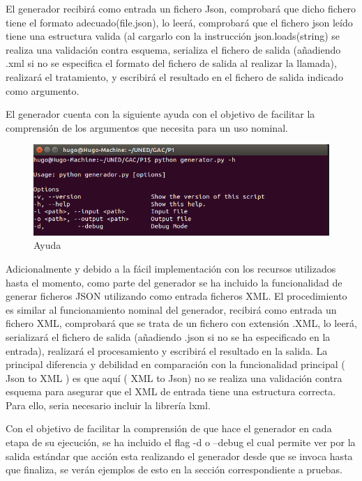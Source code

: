 \documentclass[a4paper,11pt]{book}
\begin{document}
El generador recibirá como entrada un fichero Json, comprobará que dicho fichero tiene el formato adecuado(file.json), lo leerá, comprobará que el fichero json leído tiene una estructura valida (al cargarlo con la instrucción json.loads(string) se realiza una validación contra esquema, serializa el fichero de salida (añadiendo .xml si no se especifica el formato del fichero de salida al realizar la llamada), realizará el tratamiento, y escribirá el resultado en el fichero de salida indicado como argumento. 

El generador cuenta con la siguiente ayuda con el objetivo de facilitar la comprensión de los argumentos que necesita para un uso nominal. 

\begin{figure}[htbpH]  
\centering 
\includegraphics[scale=0.35]{imagenes/help.png}
\caption{ Ayuda  }  
\end{figure}  

Adicionalmente y debido a la fácil implementación con los recursos utilizados hasta el momento, como parte del generador se ha incluido la funcionalidad de generar ficheros JSON utilizando como entrada ficheros XML. El procedimiento es similar al funcionamiento nominal del generador, recibirá como entrada un fichero XML, comprobará que se trata de un fichero con extensión .XML, lo leerá, serializará el fichero de salida (añadiendo .json si no se ha especificado en la entrada), realizará el procesamiento y escribirá el resultado en la salida. La principal diferencia y debilidad en comparación con la funcionalidad principal ( Json to XML ) es que aquí ( XML to Json) no se realiza una validación contra esquema para asegurar que el XML de entrada tiene una estructura correcta. Para ello, seria necesario incluir la librería lxml. 

Con el objetivo de facilitar la comprensión de que hace el generador en cada etapa de su ejecución, se ha incluido el flag -d o --debug el cual permite ver por la salida estándar que acción esta realizando el generador desde que se invoca hasta que finaliza, se verán ejemplos de esto en la sección correspondiente a pruebas.     
\end{document}
